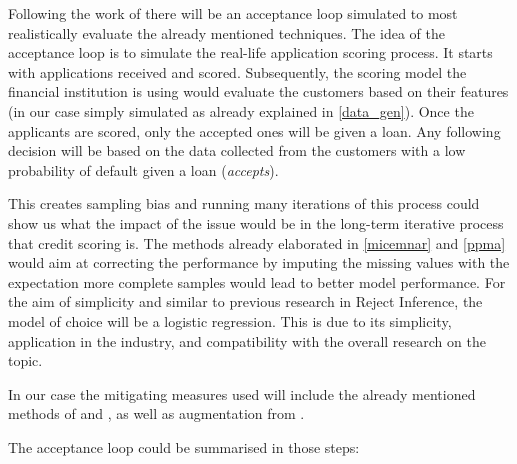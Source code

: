 \documentclass[11pt,a4paper]{article}
\begin{document}
Following the work of %
there will be an acceptance loop simulated to most realistically evaluate the already mentioned techniques. The idea of the acceptance loop is to simulate the real-life application scoring process. 
It starts with applications received and scored. Subsequently, the scoring model the financial institution is using would evaluate the customers based on their features (in our case simply simulated as already explained in \ref{data_gen}). Once the applicants are scored, only the accepted ones will be given a loan. Any following decision will be based on the data collected from the customers with a low probability of default given a loan (\textit{accepts}). 

This creates sampling bias and running many iterations of this process could show us what the impact of the issue would be in the long-term iterative process that credit scoring is. The methods already elaborated in \ref{micemnar} and \ref{ppma} would aim at correcting the performance by imputing the missing values with the expectation more complete samples would lead to better model performance. For the aim of simplicity and similar to previous research in Reject Inference, the model of choice will be a logistic regression. This is due to its simplicity, application in the industry, and compatibility with the overall research on the topic. 

In our case the mitigating measures used will include the already mentioned methods of \cite{galimard_heckman_2018} and \cite{Andridge_Little_2020}, as well as augmentation from \cite{ehrhardt_reject_2021}. 

The acceptance loop could be summarised in those steps: 



\newcommand{\makeboxlabel}[1]{\fbox{#1.}\hfill}%
\newenvironment{boxlabel}
  {\begin{list}
    {\arabic{boxlblcounter}}
    {\usecounter{boxlblcounter}
     \setlength{\labelwidth}{3em}
     \setlength{\labelsep}{0em}
     \setlength{\itemsep}{2pt}
     \setlength{\leftmargin}{1.5cm}
     \setlength{\rightmargin}{2cm}
     \setlength{\itemindent}{0em} 
     \let\makelabel=\makeboxlabel
    }
  }
{\end{list}}


\newcommand{\randomtext}{}

\noindent\randomtext
\end{document}
